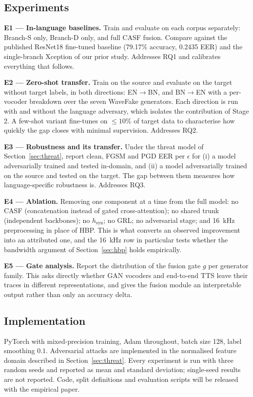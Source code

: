 \documentclass[conference]{IEEEtran}
\begin{document}
\subsection{Experiments}
\textbf{E1 --- In-language baselines.} Train and evaluate on each corpus
separately: Branch-S only, Branch-D only, and full CASF fusion. Compare
against the published ResNet18 fine-tuned baseline
(79.17\% accuracy, 0.2435 EER) and the single-branch Xception of our prior
study. Addresses RQ1 and calibrates everything that follows.

\textbf{E2 --- Zero-shot transfer.} Train on the source and evaluate on the
target without target labels, in both directions: EN$\rightarrow$BN, and
BN$\rightarrow$EN with a per-vocoder breakdown over the seven WaveFake
generators. Each direction is run with and without the language adversary,
which isolates the contribution of Stage 2. A few-shot variant fine-tunes
on $\leq 10\%$ of target data to characterise how quickly the gap closes
with minimal supervision. Addresses RQ2.

\textbf{E3 --- Robustness and its transfer.} Under the threat model of
Section~\ref{sec:threat}, report clean, FGSM and PGD EER per $\epsilon$ for
(i) a model adversarially trained and tested in-domain, and (ii) a model
adversarially trained on the source and tested on the target. The gap
between them measures how language-specific robustness is. Addresses RQ3.

\textbf{E4 --- Ablation.} Removing one component at a time from the full
model: no CASF (concatenation instead of gated cross-attention); no shared
trunk (independent backbones); no $h_{\mathrm{syn}}$; no GRL; no
adversarial stage; and 16~kHz preprocessing in place of HBP. This is what
converts an observed improvement into an attributed one, and the 16~kHz row
in particular tests whether the bandwidth argument of
Section~\ref{sec:hbp} holds empirically.

\textbf{E5 --- Gate analysis.} Report the distribution of the fusion gate
$g$ per generator family. This asks directly whether GAN vocoders and
end-to-end TTS leave their traces in different representations, and gives
the fusion module an interpretable output rather than only an accuracy
delta.

\subsection{Implementation}
PyTorch with mixed-precision training, Adam throughout, batch size 128,
label smoothing $0.1$. Adversarial attacks are implemented in the
normalised feature domain described in Section~\ref{sec:threat}. Every
experiment is run with three random seeds and reported as mean and standard
deviation; single-seed results are not reported. Code, split definitions
and evaluation scripts will be released with the empirical paper.
\end{document}
